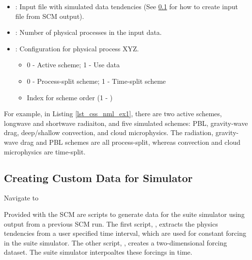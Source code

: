 \begin{itemize}
\item {}: Input file with simulated data tendencies (See \ref{section:Creating_Custom_Data_for_Simulator} for how to create input file from SCM output).
\item {}: Number of physical processes in the input data.
\item {}: Configuration for physical process XYZ.
\begin{itemize}
\item 0 - Active scheme; 1 - Use data
\item 0 - Process-split scheme; 1 - Time-split scheme
\item Index for scheme order (1 - )
\end{itemize}
\end{itemize}

For example, in Listing \ref{lst_css_nml_ex1}, there are two active schemes, longwave and shortwave radiaiton, and five simulated schemes: PBL, gravity-wave drag, deep/shallow convection, and cloud microphysics. The radiation, gravity-wave drag and PBL schemes are all process-split, whereas convection and cloud microphysics are time-split. 

\subsection{Creating Custom Data for Simulator}
\label{section:Creating_Custom_Data_for_Simulator}

Navigate to 

Provided with the SCM are scripts to generate data for the suite simulator using output from a previous SCM run. The first script, , extracts the physics tendencies from a user specified time interval, which are used for constant forcing in the suite simulator. The other script, , creates a two-dimensional forcing dataset. The suite simulator interpoaltes these forcings in time.

